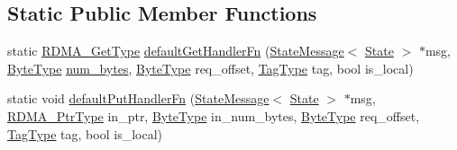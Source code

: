 \subsection*{Static Public Member Functions}
\begin{DoxyCompactItemize}
\item 
static \hyperlink{namespacevt_a1cab7f4860f65a49ad2c042d6240f288}{R\+D\+M\+A\+\_\+\+Get\+Type} \hyperlink{structvt_1_1rdma_1_1_state_a1bf31d5a7099c678a004b12e374ad220}{default\+Get\+Handler\+Fn} (\hyperlink{structvt_1_1rdma_1_1_state_message}{State\+Message}$<$ \hyperlink{structvt_1_1rdma_1_1_state}{State} $>$ $\ast$msg, \hyperlink{namespacevt_aab8d55968084610ce3b17057981e9300}{Byte\+Type} \hyperlink{structvt_1_1rdma_1_1_state_a0c249d4fe06c8ec521ac6f68b064e8a2}{num\+\_\+bytes}, \hyperlink{namespacevt_aab8d55968084610ce3b17057981e9300}{Byte\+Type} req\+\_\+offset, \hyperlink{namespacevt_a84ab281dae04a52a4b243d6bf62d0e52}{Tag\+Type} tag, bool is\+\_\+local)
\item 
static void \hyperlink{structvt_1_1rdma_1_1_state_a529be951a782923d38158859111897cd}{default\+Put\+Handler\+Fn} (\hyperlink{structvt_1_1rdma_1_1_state_message}{State\+Message}$<$ \hyperlink{structvt_1_1rdma_1_1_state}{State} $>$ $\ast$msg, \hyperlink{namespacevt_a9e2c953286c7616f7c218e9951790776}{R\+D\+M\+A\+\_\+\+Ptr\+Type} in\+\_\+ptr, \hyperlink{namespacevt_aab8d55968084610ce3b17057981e9300}{Byte\+Type} in\+\_\+num\+\_\+bytes, \hyperlink{namespacevt_aab8d55968084610ce3b17057981e9300}{Byte\+Type} req\+\_\+offset, \hyperlink{namespacevt_a84ab281dae04a52a4b243d6bf62d0e52}{Tag\+Type} tag, bool is\+\_\+local)
\end{DoxyCompactItemize}
